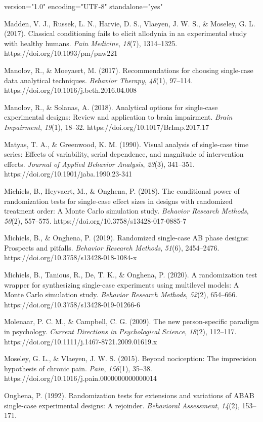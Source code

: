 version="1.0" encoding="UTF-8" standalone="yes" \documentclass{article}
\begin{document}
Madden, V. J., Russek, L. N., Harvie, D. S., Vlaeyen, J. W. S., \& Moseley, G. L. (2017). Classical conditioning fails to elicit allodynia in an experimental study with healthy humans. \emph{Pain Medicine}, \emph{18}(7), 1314--1325. https://doi.org/10.1093/pm/pnw221

Manolov, R., \& Moeyaert, M. (2017). Recommendations for choosing single-case data analytical techniques. \emph{Behavior Therapy}, \emph{48}(1), 97--114. https://doi.org/10.1016/j.beth.2016.04.008

Manolov, R., \& Solanas, A. (2018). Analytical options for single-case experimental designs: Review and application to brain impairment. \emph{Brain Impairment}, \emph{19}(1), 18--32. https://doi.org/10.1017/BrImp.2017.17

Matyas, T. A., \& Greenwood, K. M. (1990). Visual analysis of single-case time series: Effects of variability, serial dependence, and magnitude of intervention effects. \emph{Journal of Applied Behavior Analysis}, \emph{23}(3), 341--351. https://doi.org/10.1901/jaba.1990.23-341

Michiels, B., Heyvaert, M., \& Onghena, P. (2018). The conditional power of randomization tests for single-case effect sizes in designs with randomized treatment order: A Monte Carlo simulation study. \emph{Behavior Research Methods}, \emph{50}(2), 557--575. https://doi.org/10.3758/s13428-017-0885-7

Michiels, B., \& Onghena, P. (2019). Randomized single-case AB phase designs: Prospects and pitfalls. \emph{Behavior Research Methods}, \emph{51}(6), 2454--2476. https://doi.org/10.3758/s13428-018-1084-x

Michiels, B., Tanious, R., De, T. K., \& Onghena, P. (2020). A randomization test wrapper for synthesizing single-case experiments using multilevel models: A Monte Carlo simulation study. \emph{Behavior Research Methods}, \emph{52}(2), 654--666. https://doi.org/10.3758/s13428-019-01266-6

Molenaar, P. C. M., \& Campbell, C. G. (2009). The new person-specific paradigm in psychology. \emph{Current Directions in Psychological Science}, \emph{18}(2), 112--117. https://doi.org/10.1111/j.1467-8721.2009.01619.x

Moseley, G. L., \& Vlaeyen, J. W. S. (2015). Beyond nociception: The imprecision hypothesis of chronic pain. \emph{Pain}, \emph{156}(1), 35--38. https://doi.org/10.1016/j.pain.0000000000000014

Onghena, P. (1992). Randomization tests for extensions and variations of ABAB single-case experimental designs: A rejoinder. \emph{Behavioral Assessment}, \emph{14}(2), 153--171.
\end{document}
